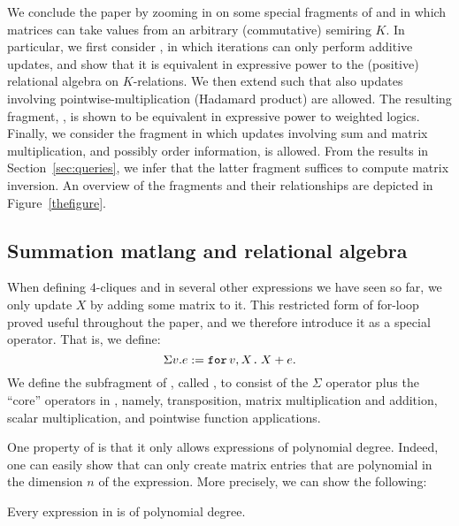 We conclude the paper by zooming in on some special fragments of \langfor and in which matrices can take values from an arbitrary (commutative) semiring $K$. In particular, we first consider \langsum, in which iterations can only perform
additive updates, and show that it is equivalent in expressive power to the (positive)
relational algebra on $K$-relations. We then extend \langsum such that also updates involving pointwise-multiplication (Hadamard product) are allowed. The resulting fragment, \langprod, is shown to be equivalent in expressive power to weighted logics. Finally, we consider the fragment \langmprod in which updates involving sum and matrix multiplication, and possibly order information, is allowed. From the results in Section~\ref{sec:queries}, we infer that the latter fragment suffices to compute matrix inversion. An overview of the fragments and their relationships are depicted in Figure~\ref{thefigure}.

\subsection{Summation matlang and relational algebra}
\label{ss:sumML}
When defining $4$-cliques and in several other expressions we have seen so far, we 
only update $X$ by adding some matrix to it. This restricted form of for-loop proved useful throughout the paper, and we therefore introduce it as a special operator. That is, we define:
$$\Sigma v. e := \texttt{for}\, v,X \texttt{.}\, X + e.$$
We define the subfragment of \langfor, called \langsum, to consist of the $\Sigma$ operator plus the ``core'' operators in \lang, namely, transposition, matrix multiplication and addition, scalar multiplication, and pointwise function applications.

One property of \langsum is that it only allows expressions of polynomial degree. Indeed, one can easily show that \langsum can only create matrix entries that are polynomial in the dimension $n$ of the expression. More precisely, we can show the following:
\begin{proposition}\label{prop:poly}
Every expression in \langsum is of polynomial degree.
\end{proposition}

